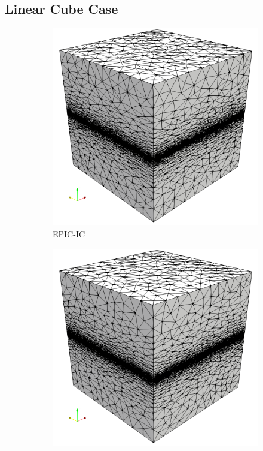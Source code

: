 \documentclass[3p,times,procedia,number]{elsarticle}
\begin{document}
\subsection{Linear Cube Case}

\begin{figure}
\begin{subfigure}{.24\textwidth}
\centering
\includegraphics[width=\textwidth]{epic-ic-cube-linear.png}
\caption{EPIC-IC}
\end{subfigure}
\begin{subfigure}{.24\textwidth}
\centering
\includegraphics[width=\textwidth]{epic-ics-cube-linear.png}

\end{subfigure}
\end{figure}
\end{document}
